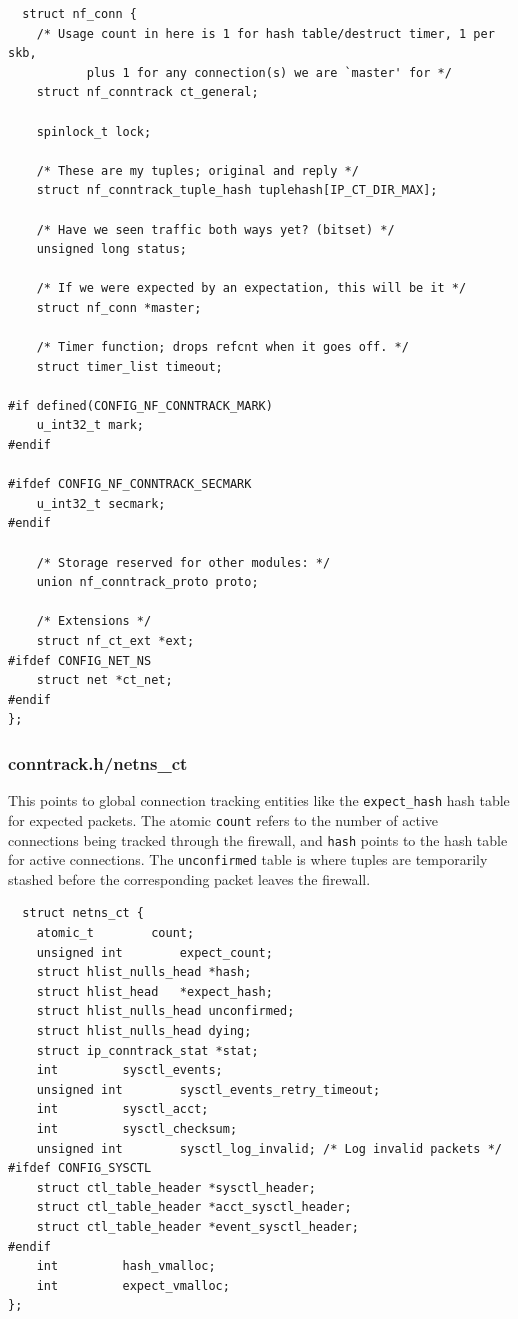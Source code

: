 \documentclass[a4paper,10pt]{article}
\begin{document}
\begin{lstlisting}
  struct nf_conn {
	/* Usage count in here is 1 for hash table/destruct timer, 1 per skb,
           plus 1 for any connection(s) we are `master' for */
	struct nf_conntrack ct_general;

	spinlock_t lock;

	/* These are my tuples; original and reply */
	struct nf_conntrack_tuple_hash tuplehash[IP_CT_DIR_MAX];

	/* Have we seen traffic both ways yet? (bitset) */
	unsigned long status;

	/* If we were expected by an expectation, this will be it */
	struct nf_conn *master;

	/* Timer function; drops refcnt when it goes off. */
	struct timer_list timeout;

#if defined(CONFIG_NF_CONNTRACK_MARK)
	u_int32_t mark;
#endif

#ifdef CONFIG_NF_CONNTRACK_SECMARK
	u_int32_t secmark;
#endif

	/* Storage reserved for other modules: */
	union nf_conntrack_proto proto;

	/* Extensions */
	struct nf_ct_ext *ext;
#ifdef CONFIG_NET_NS
	struct net *ct_net;
#endif
};
\end{lstlisting}

\subsubsection{conntrack.h/netns\_ct}

This points to global connection tracking entities like the
\verb|expect_hash| hash table for expected packets. The atomic
\verb|count| refers to the number of active connections being tracked
through the firewall, and \verb|hash| points to the hash table for
active connections. The \verb|unconfirmed| table is where tuples are
temporarily stashed before the corresponding packet leaves the
firewall.

\begin{lstlisting}
  struct netns_ct {
	atomic_t		count;
	unsigned int		expect_count;
	struct hlist_nulls_head	*hash;
	struct hlist_head	*expect_hash;
	struct hlist_nulls_head	unconfirmed;
	struct hlist_nulls_head	dying;
	struct ip_conntrack_stat *stat;
	int			sysctl_events;
	unsigned int		sysctl_events_retry_timeout;
	int			sysctl_acct;
	int			sysctl_checksum;
	unsigned int		sysctl_log_invalid; /* Log invalid packets */
#ifdef CONFIG_SYSCTL
	struct ctl_table_header	*sysctl_header;
	struct ctl_table_header	*acct_sysctl_header;
	struct ctl_table_header	*event_sysctl_header;
#endif
	int			hash_vmalloc;
	int			expect_vmalloc;
};
\end{lstlisting}
\end{document}
